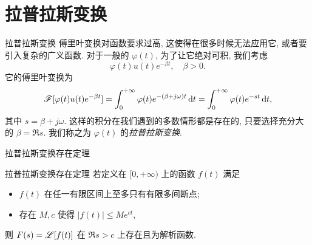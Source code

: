 \section{拉普拉斯变换}


\begin{frame}{拉普拉斯变换}
\onslide<+->
傅里叶变换对函数要求过高, 这使得在很多时候无法应用它, 或者要引入复杂的广义函数.
\onslide<+->
对于一般的 $\varphi(t)$, 为了让它绝对可积, 我们考虑
\[\varphi(t)u(t)e^{-\beta t},\quad\beta>0.\]
\onslide<+->
它的傅里叶变换为
\[\mathscr{F}[\varphi(t)u(t)e^{-\beta t}]=\int_0^{+\infty}\varphi(t)e^{-(\beta+j\omega)t}\,\mathrm{d} t=\int_0^{+\infty}\varphi(t)e^{-st}\,\mathrm{d} t,\]
其中 $s=\beta+j\omega$.
\onslide<+->
这样的积分在我们遇到的多数情形都是存在的, 只要选择充分大的 $\beta=\Re s$.
\onslide<+->
我们称之为 $\varphi(t)$ 的\emph{拉普拉斯变换}.
\end{frame}


\begin{frame}{拉普拉斯变换存在定理}
\begin{block}{拉普拉斯变换存在定理}
若定义在 $[0,+\infty)$ 上的函数 $f(t)$ 满足
\begin{itemize}
\item $f(t)$ 在任一有限区间上至多只有有限多间断点;
\item 存在 $M,c$ 使得 $|f(t)|\le Me^{ct}$,
\end{itemize}
\onslide<+->
则 $F(s)=\mathscr{L}[f(t)]$ 在 $\Re s>c$ 上存在且为解析函数.
\end{block}
\onslide<+->
\begin{center}
\end{center}
\end{frame}



